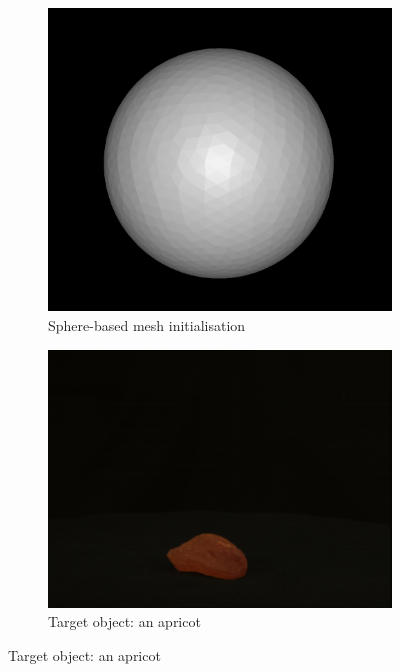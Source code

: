 \documentclass{article}
\begin{document}
\begin{figure}[h!]
  \centering
  \begin{subfigure}{0.3\textwidth}
    \centering
    \includegraphics[width=\textwidth]{images/sphereinit.png}
    \caption{Sphere-based mesh initialisation}
    \label{sphereinit}
  \end{subfigure}
  \hfill
  \begin{subfigure}{0.3\textwidth}
    \centering
    \includegraphics[width=\textwidth]{images/apricot.png}
    \caption{Target object: an apricot}
    \label{apricot}
  \end{subfigure}

\end{figure}
\end{document}

